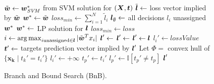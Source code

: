 \begin{figure}[t!]
\vspace{-3mm}
\caption{
Branch and Bound Search (BnB).\hfill\; \\
}
\label{alg:BnB.Final}
{\footnotesize
\begin{algorithmic}[1]
\State $\tilde{\boldsymbol{w}} \gets \boldsymbol{w}^*_{\mathit{SVM}}$ from SVM solution for $(\boldsymbol{X},\boldsymbol{t})$
\State $\tilde{\boldsymbol{l}} \gets $ loss vector implied by $\tilde{\boldsymbol{w}}$
\State $\boldsymbol{w}^* \gets \tilde{\boldsymbol{w}}$
\State $loss_{min} \gets \sum_{i=1}^N \tilde{l}_i$ 
\State $\boldsymbol{l}_\emptyset \gets $ all decisions $l_i$ unassigned
\State {}
\State \Return $\boldsymbol{w}^*$
\Statex
{}
      \State $\boldsymbol{w}^* \gets$ LP solution for $\boldsymbol{l}$ 
      \State $loss_{min} \gets loss$
   \Else
      \State $i \gets \argmax_{i \text{unassigned} \in \l} |\tilde{\w}^Tx_i|$
      \State $\boldsymbol{l}' \gets$ 
         \State {}
      \EndIf
      \State $\boldsymbol{l}' \gets$ 
         \State {}
      \EndIf
   \EndIf
\EndProcedure
\Statex
{} 
   \State $\boldsymbol{l}' \gets \boldsymbol{l}$
   \State $l_i' \gets lossValue$   
   \State $\boldsymbol{t}' \gets $ targets prediction vector implied by $\boldsymbol{l}'$ 
   \State Let $\Phi =$ convex hull of $\{ \boldsymbol{x_k} \; | \; t_k'=t_i' \}$ 
      \State $l_i' \gets +\infty$ 
   \Else
         \State $t_p' \gets t_i'$ 
         \State $l_p' \gets \mathbb{I} [t_p' \not= t_p]$
      \EndIf
   \EndFor
   \EndIf  
   \State \Return $\boldsymbol{l}'$ 
\EndFunction
\Statex
\EndFunction
\end{algorithmic}}
\vspace{-4mm}
\end{figure}

